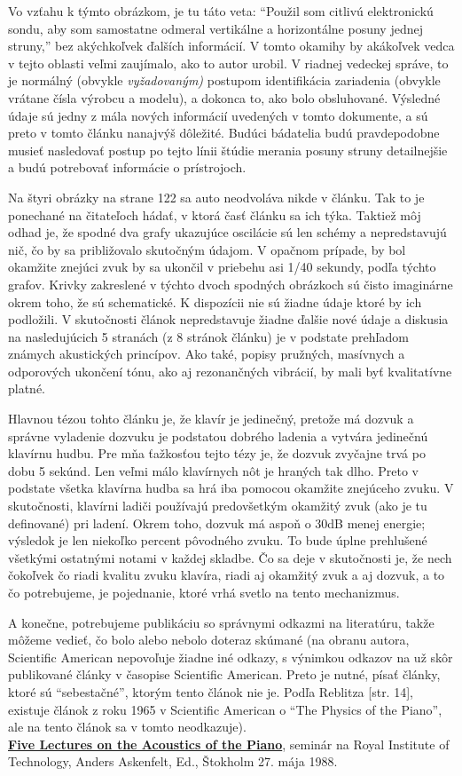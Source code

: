 Vo vzťahu k týmto obrázkom, je tu táto veta: “Použil som citlivú elektronickú sondu, aby som samostatne odmeral vertikálne a horizontálne posuny jednej struny,” bez akýchkoľvek ďalších informácií. V tomto okamihy by akákoľvek vedca v tejto oblasti veľmi zaujímalo, ako to autor urobil. V riadnej vedeckej správe, to je normálný (obvykle \textit{vyžadovaným)} postupom identifikácia zariadenia (obvykle vrátane čísla výrobcu a modelu), a dokonca to, ako bolo obsluhované. Výsledné údaje sú jedny z mála nových informácií uvedených v tomto dokumente, a sú preto v tomto článku nanajvýš dôležité. Budúci bádatelia budú pravdepodobne musieť nasledovať postup po tejto línii štúdie merania posuny struny detailnejšie a budú potrebovať informácie o prístrojoch. 

Na štyri obrázky na strane 122 sa auto neodvoláva nikde v článku. Tak to je ponechané na čitateľoch hádať, v ktorá časť článku sa ich týka. Taktiež môj odhad je, že spodné dva grafy ukazujúce oscilácie sú len schémy a nepredstavujú nič, čo by sa približovalo skutočným údajom. V opačnom prípade, by bol okamžite znejúci zvuk by sa ukončil v priebehu asi 1/40 sekundy, podľa týchto grafov. Krivky zakreslené v týchto dvoch spodných obrázkoch sú čisto imaginárne okrem toho, že sú schematické. K dispozícii nie sú žiadne údaje ktoré by ich podložili. V skutočnosti článok nepredstavuje žiadne ďalšie nové údaje a diskusia na nasledujúcich 5 stranách (z 8 stránok článku) je v podstate prehľadom známych akustických princípov. Ako také, popisy pružných, masívnych a odporových ukončení tónu, ako aj rezonančných vibrácií, by mali byť kvalitatívne platné. 

Hlavnou tézou tohto článku je, že klavír je jedinečný, pretože má dozvuk a správne vyladenie dozvuku je podstatou dobrého ladenia a vytvára jedinečnú klavírnu hudbu. Pre mňa ťažkosťou tejto tézy je, že dozvuk zvyčajne trvá po dobu 5 sekúnd. Len veľmi málo klavírnych nôt je hraných tak dlho. Preto v podstate všetka klavírna hudba sa hrá iba pomocou okamžite znejúceho zvuku. V skutočnosti, klavírni ladiči používajú predovšetkým okamžitý zvuk (ako je tu definované) pri ladení. Okrem toho, dozvuk má  aspoň o 30dB menej energie; výsledok je len niekoľko percent pôvodného zvuku. To bude úplne prehlušené  všetkými ostatnými notami v každej skladbe. Čo sa deje v skutočnosti je, že nech čokoľvek čo riadi kvalitu zvuku klavíra, riadi aj okamžitý zvuk a aj dozvuk, a to čo potrebujeme, je pojednanie, ktoré vrhá svetlo na tento mechanizmus. 

A konečne, potrebujeme publikáciu so správnymi odkazmi na literatúru, takže môžeme vedieť, čo bolo alebo nebolo doteraz skúmané (na obranu autora, Scientific American nepovoľuje žiadne iné odkazy, s výnimkou odkazov na už skôr publikované články v časopise Scientific American. Preto je nutné, písať články, ktoré sú “sebestačné”, ktorým tento článok nie je. Podľa Reblitza [str. 14], existuje článok z roku 1965 v Scientific American o “The Physics of the Piano”, ale na tento článok sa v tomto neodkazuje). 
\medskip\\
\textbf{\href{http://www.speech.kth.se/music/5_lectures/contents.html}{Five Lectures on the Acoustics of the Piano}}, seminár na Royal Institute of Technology, Anders Askenfelt, Ed., Štokholm 27. mája 1988. 

